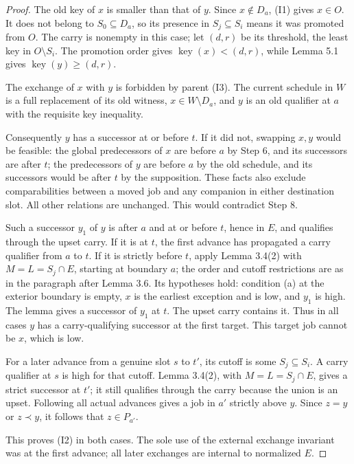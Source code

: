 \begin{proof}
The old key of \(x\) is smaller than that of \(y\). Since \(x\notin D_a\), (I1) gives \(x\in O\). It does not belong to \(S_0\subseteq D_a\), so its presence in \(S_j\subseteq S_i\) means it was promoted from \(O\). The carry is nonempty in this case; let \((d,r)\) be its threshold, the least key in \(O\setminus S_i\). The promotion order gives \(\operatorname{key}(x)<(d,r)\), while Lemma 5.1 gives \(\operatorname{key}(y)\geq(d,r)\).

The exchange of \(x\) with \(y\) is forbidden by parent (I3). The current schedule in \(W\) is a full replacement of its old witness, \(x\in W\setminus D_a\), and \(y\) is an old qualifier at \(a\) with the requisite key inequality.

Consequently \(y\) has a successor at or before \(t\). If it did not, swapping \(x,y\) would be feasible: the global predecessors of \(x\) are before \(a\) by Step 6, and its successors are after \(t\); the predecessors of \(y\) are before \(a\) by the old schedule, and its successors would be after \(t\) by the supposition. These facts also exclude comparabilities between a moved job and any companion in either destination slot. All other relations are unchanged. This would contradict Step 8.

Such a successor \(y_1\) of \(y\) is after \(a\) and at or before \(t\), hence in \(E\), and qualifies through the upset carry. If it is at \(t\), the first advance has propagated a carry qualifier from \(a\) to \(t\). If it is strictly before \(t\), apply Lemma 3.4(2) with \(M=L=S_j\cap E\), starting at boundary \(a\); the order and cutoff restrictions are as in the paragraph after Lemma 3.6. Its hypotheses hold: condition (a) at the exterior boundary is empty, \(x\) is the earliest exception and is low, and \(y_1\) is high. The lemma gives a successor of \(y_1\) at \(t\). The upset carry contains it. Thus in all cases \(y\) has a carry-qualifying successor at the first target. This target job cannot be \(x\), which is low.

For a later advance from a genuine slot \(s\) to \(t'\), its cutoff is some \(S_j\subseteq S_i\). A carry qualifier at \(s\) is high for that cutoff. Lemma 3.4(2), with \(M=L=S_j\cap E\), gives a strict successor at \(t'\); it still qualifies through the carry because the union is an upset. Following all actual advances gives a job in \(a'\) strictly above \(y\). Since \(z=y\) or \(z\prec y\), it follows that \(z\in P_{a'}\).

This proves (I2) in both cases. The sole use of the external exchange invariant was at the first advance; all later exchanges are internal to normalized \(E\).
\end{proof}

